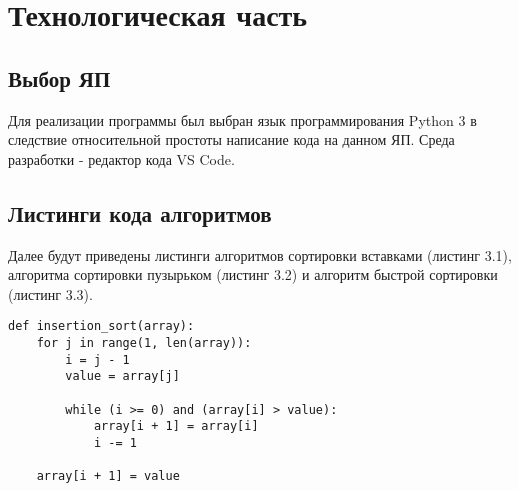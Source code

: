 \chapter{Технологическая часть}
\section{Выбор ЯП}
Для реализации программы был выбран язык программирования Python 3 в следствие относительной простоты написание кода на данном ЯП. \cite{python} Среда разработки - редактор кода VS Code. \cite{vscode}

\section{Листинги кода алгоритмов}


Далее будут приведены листинги алгоритмов сортировки вставками (листинг 3.1), алгоритма сортировки пузырьком (листинг 3.2) и алгоритм быстрой сортировки (листинг 3.3).



\begin{lstlisting}[label=CodeStand,caption=Алгоритм сортровки вставками]
def insertion_sort(array):
	for j in range(1, len(array)):
		i = j - 1
		value = array[j]
	
		while (i >= 0) and (array[i] > value):
			array[i + 1] = array[i]
			i -= 1
		
	array[i + 1] = value
\end{lstlisting}


